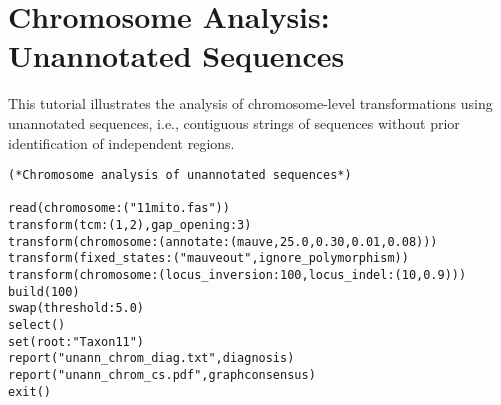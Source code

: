 \section{Chromosome Analysis: Unannotated Sequences}{\label{tutorial8}}

This tutorial illustrates the analysis of chromosome-level transformations using 
unannotated sequences, i.e., contiguous strings of sequences without prior 
identification of independent regions. 

\begin{verbatim}
(*Chromosome analysis of unannotated sequences*)

read(chromosome:("11mito.fas"))
transform(tcm:(1,2),gap_opening:3)
transform(chromosome:(annotate:(mauve,25.0,0.30,0.01,0.08)))
transform(fixed_states:("mauveout",ignore_polymorphism))
transform(chromosome:(locus_inversion:100,locus_indel:(10,0.9)))
build(100)
swap(threshold:5.0)
select()
set(root:"Taxon11")
report("unann_chrom_diag.txt",diagnosis)
report("unann_chrom_cs.pdf",graphconsensus)
exit()
\end{verbatim}

